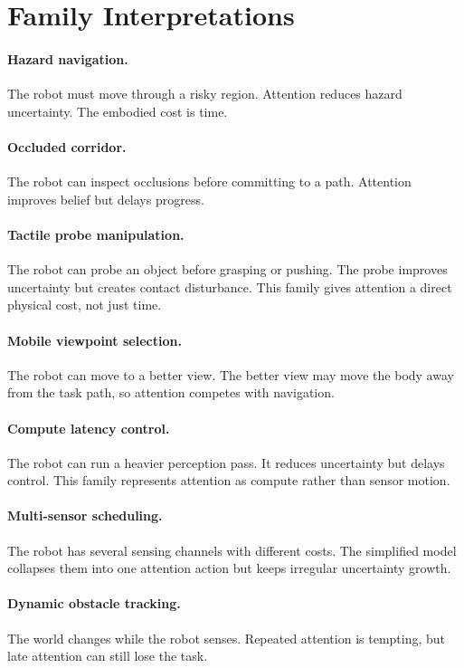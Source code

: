 \documentclass{article}
\begin{document}
\section{Family Interpretations}

\paragraph{Hazard navigation.}
The robot must move through a risky region. Attention reduces hazard
uncertainty. The embodied cost is time.

\paragraph{Occluded corridor.}
The robot can inspect occlusions before committing to a path. Attention
improves belief but delays progress.

\paragraph{Tactile probe manipulation.}
The robot can probe an object before grasping or pushing. The probe improves
uncertainty but creates contact disturbance. This family gives attention a
direct physical cost, not just time.

\paragraph{Mobile viewpoint selection.}
The robot can move to a better view. The better view may move the body away
from the task path, so attention competes with navigation.

\paragraph{Compute latency control.}
The robot can run a heavier perception pass. It reduces uncertainty but delays
control. This family represents attention as compute rather than sensor
motion.

\paragraph{Multi-sensor scheduling.}
The robot has several sensing channels with different costs. The simplified
model collapses them into one attention action but keeps irregular uncertainty
growth.

\paragraph{Dynamic obstacle tracking.}
The world changes while the robot senses. Repeated attention is tempting, but
late attention can still lose the task.
\end{document}
